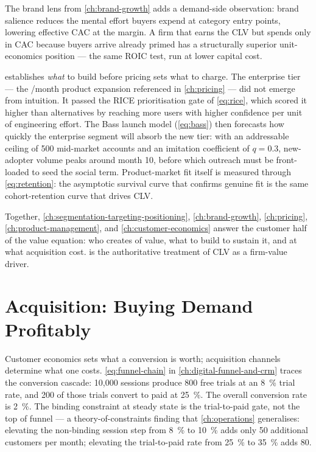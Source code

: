 The brand lens from \cref{ch:brand-growth} adds a demand-side observation: brand salience
reduces the mental effort buyers expend at category entry points, lowering effective
CAC at the margin. A firm that earns the  CLV but spends only  in
CAC because buyers arrive already primed has a structurally superior unit-economics position
--- the same ROIC test, run at lower capital cost.

 establishes \emph{what} to build before pricing sets what to
charge. The enterprise tier --- the /month product expansion referenced in
\cref{ch:pricing} --- did not emerge from intuition. It passed the RICE prioritisation gate
of \cref{eq:rice}, which scored it higher than alternatives by reaching more users with
higher confidence per unit of engineering effort. The Bass launch model (\cref{eq:bass})
then forecasts how quickly the enterprise segment will absorb the new tier: with an addressable
ceiling of 500 mid-market accounts and an imitation coefficient of \(q=0.3\), new-adopter
volume peaks around month 10, before which outreach must be front-loaded to seed the social
term. Product-market fit itself is measured through \cref{eq:retention}: the asymptotic
survival curve that confirms genuine fit is the same cohort-retention curve that drives CLV.

Together, \cref{ch:segmentation-targeting-positioning}, \cref{ch:brand-growth},
\cref{ch:pricing}, \cref{ch:product-management}, and \cref{ch:customer-economics} answer
the customer half of the value equation: who creates  of value, what to build to
sustain it, and at what acquisition cost.
\textcite{gupta2004customer} is the authoritative treatment of CLV as a firm-value driver.

\section{Acquisition: Buying Demand Profitably}\label{sec:capstone-acquisition}

Customer economics sets what a conversion is worth; acquisition channels determine
what one costs. \cref{eq:funnel-chain} in \cref{ch:digital-funnel-and-crm} traces the
conversion cascade: 10,000 sessions produce 800 free trials at an \qty{8}{\percent}
trial rate, and 200 of those trials convert to paid at \qty{25}{\percent}. The overall
conversion rate is \qty{2}{\percent}. The binding constraint at steady state is the
trial-to-paid gate, not the top of funnel --- a theory-of-constraints
finding that \cref{ch:operations} generalises: elevating the non-binding session step
from \qty{8}{\percent} to \qty{10}{\percent} adds only 50 additional customers per
month; elevating the trial-to-paid rate from \qty{25}{\percent} to \qty{35}{\percent}
adds 80.

